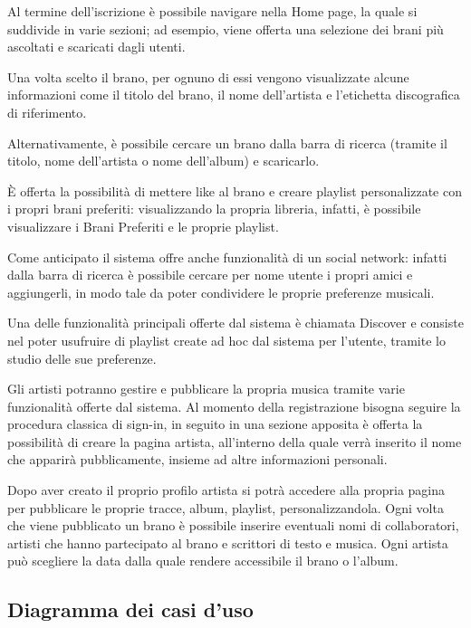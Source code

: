 Al termine dell'iscrizione è possibile navigare nella Home page, la quale si suddivide in varie sezioni; ad esempio, 
viene offerta una selezione dei brani più ascoltati e scaricati dagli utenti. 

Una volta scelto il brano, per ognuno di essi vengono visualizzate alcune informazioni come il titolo del brano, 
il nome dell'artista e l'etichetta discografica di riferimento.

Alternativamente, è possibile cercare un brano dalla barra di ricerca (tramite il titolo, nome dell'artista o nome 
dell'album) e scaricarlo.

È offerta la possibilità di mettere like al brano e creare playlist personalizzate con i propri brani preferiti: 
visualizzando la propria libreria, infatti, è possibile visualizzare i Brani Preferiti e le proprie playlist. 

Come anticipato il sistema offre anche funzionalità di un social network: infatti dalla barra di ricerca è possibile 
cercare per nome utente i propri amici e aggiungerli, in modo tale da poter condividere le proprie preferenze musicali. 

Una delle funzionalità principali offerte dal sistema è chiamata Discover e consiste nel poter usufruire di playlist 
create ad hoc dal sistema per l'utente, tramite lo studio delle sue preferenze. 

Gli artisti potranno gestire e pubblicare la propria musica tramite varie funzionalità offerte dal sistema. Al momento 
della registrazione bisogna seguire la procedura classica di sign-in, in seguito in una sezione apposita è offerta la 
possibilità di creare la pagina artista, all'interno della quale verrà inserito il nome che apparirà pubblicamente, 
insieme ad altre informazioni personali. 

Dopo aver creato il proprio profilo artista si potrà accedere alla propria pagina per pubblicare le proprie tracce, 
album, playlist, personalizzandola. Ogni volta che viene pubblicato un brano è possibile inserire eventuali nomi di 
collaboratori, artisti che hanno partecipato al brano e scrittori di testo e musica. Ogni artista può scegliere la 
data dalla quale rendere accessibile il brano o l'album.







\newpage
\subsection{Diagramma dei casi d'uso}

